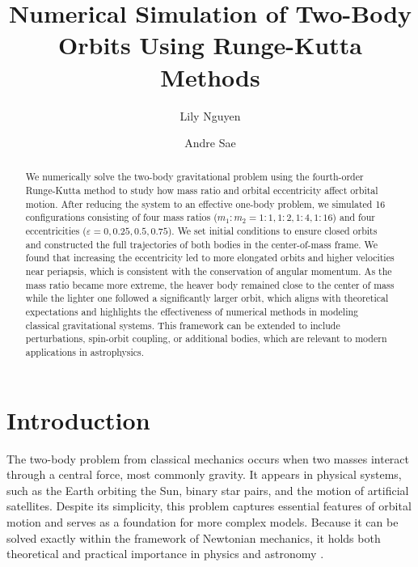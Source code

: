 \documentclass[linenumbers, twocolumn]{aastex631}
\begin{document}
\title{Numerical Simulation of Two-Body Orbits Using Runge-Kutta Methods}
\author{Lily Nguyen}

\author{Andre Sae}


\begin{abstract}

We numerically solve the two-body gravitational problem using the fourth-order
Runge-Kutta method to study how mass ratio and orbital eccentricity affect
orbital motion. After reducing the system to an effective one-body problem, we
simulated 16 configurations consisting of four mass ratios ($m_1:m_2=1:1,1:2,1:4,1:16$)
and four eccentricities ($\varepsilon=0,0.25,0.5,0.75$). We set initial conditions
to ensure closed orbits and constructed the full trajectories of both bodies in the
center-of-mass frame. We found that increasing the eccentricity led to more elongated
orbits and higher velocities near periapsis, which is consistent with the
conservation of angular momentum. As the mass ratio became more extreme, the heaver 
body remained close to the center of mass while the lighter one followed a significantly
larger orbit, which aligns with theoretical expectations and highlights the
effectiveness of numerical methods in modeling classical gravitational systems.
This framework can be extended to include perturbations, spin-orbit coupling,
or additional bodies, which are relevant to modern applications in 
astrophysics.

\end{abstract}


\section{Introduction} \label{sec:intro}

The two-body problem from classical mechanics occurs when two masses interact 
through a central force, most commonly gravity. It appears in physical 
systems, such as the Earth orbiting the Sun, binary star pairs, and the motion 
of artificial satellites. Despite its simplicity, this problem captures 
essential features of orbital motion and serves as a foundation for more 
complex models. Because it can be solved exactly within the framework of
Newtonian mechanics, it holds both theoretical and practical importance
in physics and astronomy \cite{murray}.
\end{document}
